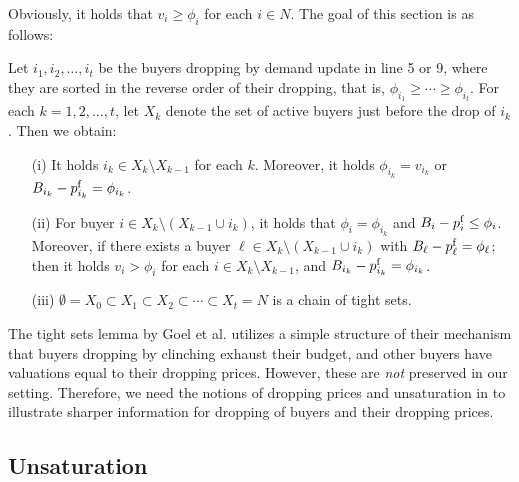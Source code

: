 \documentclass[letterpaper,11pt]{article}
\begin{document}
	Obviously, it holds that $v_i\geq \phi_i$ for each $i\in N$. 
	The goal of this section is as follows:

	\begin{theorem}
	\label{tightsets}
	Let $i_1, i_2,\ldots, i_t$ be the buyers dropping by demand update in line 5 or 9, 
	where they are sorted in the reverse order of their dropping, 
	that is, $\phi_{i_1}\geq \cdots\geq \phi_{i_t}$. 
	For each $k = 1, 2,\ldots, t$,
	let $X_k$ denote the set of active buyers just before the drop of $i_k$. Then we obtain:
	\begin{itemize}
	\item[{\rm (i)}] It holds $i_k\in X_k \setminus X_{k-1}$ for each $k$. 
	Moreover, it holds $\phi_{i_k}=v_{i_k}$ or $B_{i_k}-p^{\rm f}_{i_k}= \phi_{i_k}$.
	\item[{\rm (ii)}] For buyer $i \in X_k\setminus (X_{k-1} \cup i_k)$, it holds that $\phi_i =\phi_{i_k}$ 
	and  $B_i-p^{\rm f}_i\leq \phi_i$. 
	Moreover, if there exists a buyer $\ell \in X_k\setminus (X_{k-1}\cup i_k)$ with $B_{\ell}-p^{\rm f}_{\ell}	=\phi_{\ell}$;  then it holds $v_{i}>\phi_{i}$ for each $i \in X_k\setminus X_{k-1}$, and $B_{i_k}-p^{\rm f}_{i_k}=\phi_{i_k}$.
	\item[{\rm (iii)}] $\emptyset = X_0 \subset X_1 \subset X_2 \subset \cdots \subset X_t = N$ is a chain of tight sets.
	\end{itemize}
	\end{theorem}

	
The tight sets lemma by Goel et al. \cite{GMP2015} utilizes
a simple structure of their mechanism that
buyers dropping by clinching exhaust their budget,
and other buyers have valuations equal to their dropping prices.
However, these are {\it not} preserved in our setting.
Therefore, we need the notions of dropping prices
and unsaturation in \cite{GMP2014} 
to illustrate sharper information for dropping of buyers and their dropping prices.


	
	
	


\subsection{Unsaturation}
\end{document}
